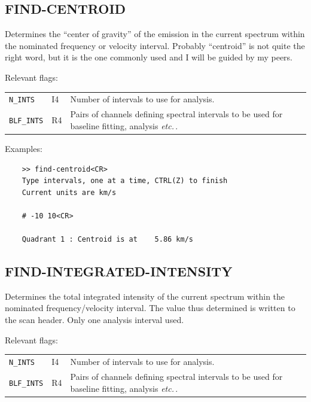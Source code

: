 \documentclass[11pt,twoside]{report}
\newcommand{\etc}{{\it etc.\,}}
\begin{document}
\subsection{FIND-CENTROID} 

Determines the ``center of gravity'' of the emission in the current spectrum
within the nominated frequency or velocity interval. Probably ``centroid''
is not quite the right word, but it is the one commonly used and I will
be guided by my peers.

Relevant flags:\\
\begin{tabular}{lll}
  \verb+N_INTS+   & I4 & Number of intervals to use for analysis.\\
  \verb+BLF_INTS+ & R4 & \parbox[t]{4in}
                          {Pairs of channels defining spectral intervals to 
                           be used for baseline fitting, analysis \etc.}
\end{tabular}

Examples:
\begin{verbatim}
    >> find-centroid<CR>
    Type intervals, one at a time, CTRL(Z) to finish
    Current units are km/s  

    # -10 10<CR>

    Quadrant 1 : Centroid is at    5.86 km/s  
\end{verbatim}

\subsection{FIND-INTEGRATED-INTENSITY} 

Determines the total integrated intensity of the current spectrum within the
nominated frequency/velocity interval. The value thus determined is
written to the scan header. Only one analysis interval used.

Relevant flags:\\
\begin{tabular}{lll}
  \verb+N_INTS+   & I4 & Number of intervals to use for analysis.\\
  \verb+BLF_INTS+ & R4 & \parbox[t]{4in}
                         {Pairs of channels defining spectral intervals to 
                          be used for baseline fitting, analysis \etc.}
\end{tabular}
\end{document}
